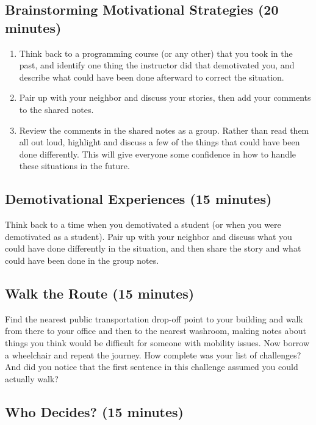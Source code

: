 \documentclass[10pt,statementpaper]{memoir}
\begin{document}
\subsection*{Brainstorming Motivational Strategies (20
minutes)}\label{brainstorming-motivational-strategies-20-minutes}

\begin{enumerate}
\def\labelenumi{\arabic{enumi}.}
\item
  Think back to a programming course (or any other) that you took in the
  past, and identify one thing the instructor did that demotivated you,
  and describe what could have been done afterward to correct the
  situation.
\item
  Pair up with your neighbor and discuss your stories, then add your
  comments to the shared notes.
\item
  Review the comments in the shared notes as a group. Rather than read
  them all out loud, highlight and discuss a few of the things that
  could have been done differently. This will give everyone some
  confidence in how to handle these situations in the future.
\end{enumerate}

\subsection*{Demotivational Experiences (15
minutes)}\label{demotivational-experiences-15-minutes}

Think back to a time when you demotivated a student (or when you were
demotivated as a student). Pair up with your neighbor and discuss what
you could have done differently in the situation, and then share the
story and what could have been done in the group notes.

\subsection*{Walk the Route (15
minutes)}\label{walk-the-route-15-minutes}

Find the nearest public transportation drop-off point to your building
and walk from there to your office and then to the nearest washroom,
making notes about things you think would be difficult for someone with
mobility issues. Now borrow a wheelchair and repeat the journey. How
complete was your list of challenges? And did you notice that the first
sentence in this challenge assumed you could actually walk?

\subsection*{Who Decides? (15 minutes)}\label{who-decides-15-minutes}
\end{document}
